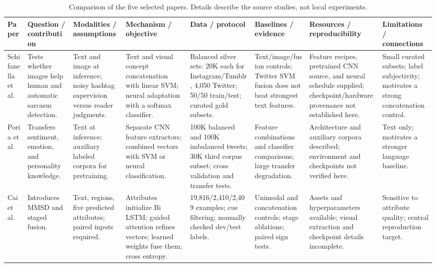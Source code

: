 \documentclass[conference]{IEEEtran}
\begin{document}
\begin{table}[t]
\caption{Comparison of the five selected papers. Details describe the source studies, not local experiments.}
\label{tab:literature}
\centering
\scriptsize
\setlength{\tabcolsep}{2pt}
\renewcommand{\arraystretch}{1.15}
\begin{tabular}{|P{0.065\textwidth}|P{0.11\textwidth}|P{0.11\textwidth}|P{0.135\textwidth}|P{0.115\textwidth}|P{0.125\textwidth}|P{0.115\textwidth}|P{0.13\textwidth}|}
\hline
\textbf{Paper} & \textbf{Question / contribution} & \textbf{Modalities / assumptions} & \textbf{Mechanism / objective} & \textbf{Data / protocol} & \textbf{Baselines / evidence} & \textbf{Resources / reproducibility} & \textbf{Limitations / connections} \\
\hline
Schifanella et al.~\cite{schifanella2016} & Tests whether images help human and automatic sarcasm detection. & Text and image at inference; noisy hashtag supervision versus reader judgments. & Text and visual concept concatenation with linear SVM; neural adaptation with a softmax classifier. & Balanced silver sets: 20K each for Instagram/Tumblr, 4,050 Twitter; 50/50 train/test; curated gold subsets. & Text/image/fusion controls; Twitter SVM fusion does not beat strongest text features. & Feature recipes, pretrained CNN source, and neural schedule supplied; checkpoint/hardware provenance not established here. & Small curated subsets; label subjectivity; motivates a strong concatenation control. \\
\hline
Poria et al.~\cite{poria2016} & Transfers sentiment, emotion, and personality knowledge. & Text at inference; auxiliary labeled corpora for pretraining. & Separate CNN feature extractors; combined vectors with SVM or neural classification. & 100K balanced and 100K imbalanced tweets; 30K third corpus subset; cross validation and transfer tests. & Feature combinations and classifier comparisons; large transfer degradation. & Architecture and auxiliary corpora described; environment and checkpoints not verified here. & Text only; motivates a stronger language baseline. \\
\hline
Cai et al.~\cite{cai2019} & Introduces MMSD and staged fusion. & Text, regions, five predicted attributes; paired inputs required. & Attributes initialize Bi LSTM; guided attention refines vectors; learned weights fuse them; cross entropy. & 19,816/2,410/2,409 examples; cue filtering; manually checked dev/test labels. & Unimodal and concatenation controls; stage ablations; paired sign tests. & Assets and hyperparameters available; visual extraction and checkpoint details incomplete. & Sensitive to attribute quality; central reproduction target. \\

\end{tabular}
\end{table}
\end{document}
